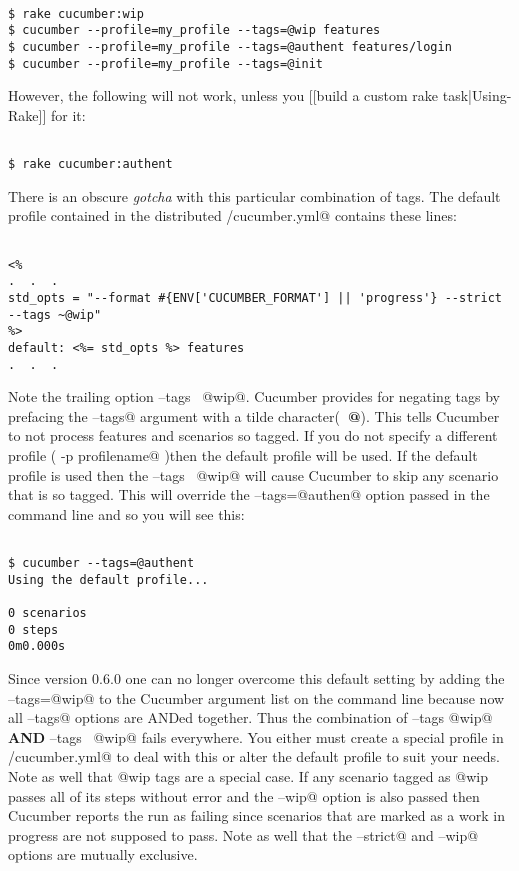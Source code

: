 \documentclass[10pt]{book}
\begin{document}
\begin{verbatim}

$ rake cucumber:wip
$ cucumber --profile=my_profile --tags=@wip features
$ cucumber --profile=my_profile --tags=@authent features/login
$ cucumber --profile=my_profile --tags=@init 

\end{verbatim}
However, the following will not work, unless you [[build a custom rake task|Using-Rake]] for it:

\begin{verbatim}

$ rake cucumber:authent

\end{verbatim}
There is an obscure \emph{gotcha} with this particular combination of tags.  The default profile contained in the distributed \verb@config/cucumber.yml@ contains these lines:

\begin{verbatim}

<%
.  .  .
std_opts = "--format #{ENV['CUCUMBER_FORMAT'] || 'progress'} --strict --tags ~@wip"
%>
default: <%= std_opts %> features
.  .  .

\end{verbatim}
Note the trailing option \verb@--tags ~@wip@.  Cucumber provides for negating tags by prefacing the \verb@--tags@ argument with a tilde character(\textbf{\verb@~@}).  This tells Cucumber to not process features and scenarios so tagged. If you do not specify a different profile ( \verb@cucumber -p profilename@ )then the default profile will be used.  If the default profile is used then the \verb@--tags ~@wip@ will cause Cucumber to skip any scenario that is so tagged.  This will override the \verb@--tags=@authen@ option passed in the command line and so you will see this:

\begin{verbatim}

$ cucumber --tags=@authent
Using the default profile...

0 scenarios
0 steps
0m0.000s

\end{verbatim}
Since version 0.6.0 one can no longer overcome this default setting by adding the \verb@--tags=@wip@ to the Cucumber argument list on the command line because now all \verb@--tags@ options are ANDed together.  Thus the combination of \verb@--tags @wip@ \textbf{AND} \verb@--tags ~@wip@ fails everywhere.  You either must create a special profile in \verb@config/cucumber.yml@ to deal with this or alter the default profile to suit your needs.  Note as well that @wip tags are a special case. If any scenario tagged as @wip passes all of its steps without error and the \verb@--wip@ option is also passed then Cucumber reports the run as failing since scenarios that are marked as a work in progress are not supposed to pass.  Note as well that the \verb@--strict@ and \verb@--wip@ options are mutually exclusive.
\end{document}

